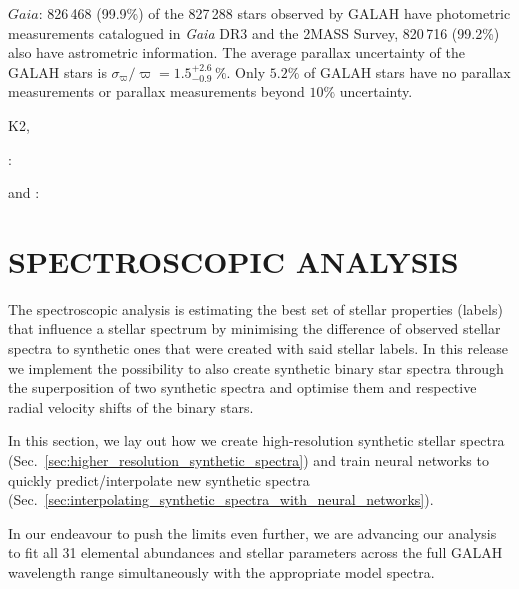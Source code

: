 \documentclass[
  journal=pasa,
  manuscript=research-paper, %
  year=2021,
  volume=37
]{cup-journal}
\newcommand{\Gaia}{\textit{Gaia}\xspace}
\begin{document}
$Gaia$: 826\,468 (99.9\%) of the 827\,288 stars observed by GALAH have photometric measurements catalogued in \Gaia DR3 and the 2MASS Survey, 820\,716 (99.2\%) also have astrometric information. The average parallax uncertainty of the GALAH stars is $\sigma_{\varpi} / \varpi = 1.5_{-0.9}^{+2.6}\,\mathrm{\%}$. Only $5.2\%$ of GALAH stars have no parallax measurements or parallax measurements beyond $10\%$ uncertainty.


K2,

\citet{CantatGaudin2020}:

\citet{Vasiliev2021} and \citet{Baumgardt2021}:

\section{SPECTROSCOPIC ANALYSIS}
\label{sec:spectroscopic_analysis}

The spectroscopic analysis is estimating the best set of stellar properties (labels) that influence a stellar spectrum by minimising the difference of observed stellar spectra to synthetic ones that were created with said stellar labels. In this release we implement the possibility to also create synthetic binary star spectra through the superposition of two synthetic spectra and optimise them and respective radial velocity shifts of the binary stars.

In this section, we lay out how we create high-resolution synthetic stellar spectra (Sec.~\ref{sec:higher_resolution_synthetic_spectra}) and train neural networks to quickly predict/interpolate new synthetic spectra (Sec.~\ref{sec:interpolating_synthetic_spectra_with_neural_networks}).

In our endeavour to push the limits even further, we are advancing our analysis to fit all 31 elemental abundances and stellar parameters across the full GALAH wavelength range simultaneously with the appropriate model spectra.
\end{document}
